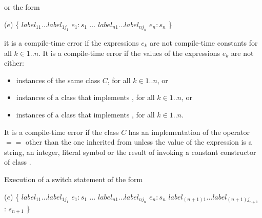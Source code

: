 \documentclass{article}
\begin{document}
 or the form

\begin{dartCode}
\SWITCH{} ($e$) \{
   $label_{11} \ldots label_{1j_1}$ \CASE{} $e_1: s_1$
   $\ldots$
   $label_{n1} \ldots label_{nj_n}$ \CASE{} $e_n: s_n$
\}
\end{dartCode}

 it is a compile-time error if the expressions $e_k$ are not compile-time constants for all $k \in 1 .. n$.
It is a compile-time error if the values of the expressions $e_k$ are not either:
\begin{itemize}
\item instances of the same class $C$, for all $k \in 1 .. n$, or
\item instances of a class that implements , for all $k \in 1 .. n$, or
\item instances of a class that implements , for all $k \in 1 .. n$.
\end{itemize}


\LMHash{}
It is a compile-time error if the class $C$ has an implementation of the operator $==$ other than the one inherited from  unless the value of the expression is a string, an integer, literal symbol or the result of invoking a constant constructor of class .



\LMHash{}
Execution of a switch statement of the form

\begin{dartCode}
\SWITCH{} ($e$) \{
   $label_{11} \ldots label_{1j_1}$ \CASE{} $e_1: s_1$
   $\ldots$
   $label_{n1} \ldots label_{nj_n}$ \CASE{} $e_n: s_n$
   $label_{(n+1)1} \ldots label_{(n+1)j_{n+1}}$ \DEFAULT{}: $s_{n+1}$
\}
\end{dartCode}
\end{document}
